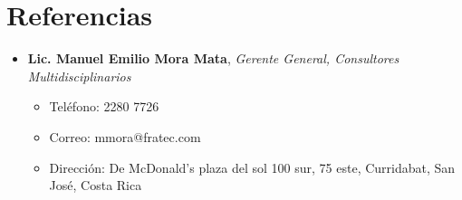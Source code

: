 \documentclass[11pt,a4paper,sans]{moderncv} %
\begin{document}



\section{Referencias}

\vspace{0.5cm}
{
\begin{itemize}
\item \textbf{Lic. Manuel Emilio Mora Mata}, \textit{Gerente General, Consultores Multidisciplinarios}
    \begin{itemize}
        \item Tel\'efono: 2280 7726
        \item Correo: mmora@fratec.com
        \item Direcci\'on: De McDonald's plaza del sol 100 sur, 75 este, Curridabat, San José, Costa Rica\\
    \end{itemize}
\end{itemize}
}







\end{document}

